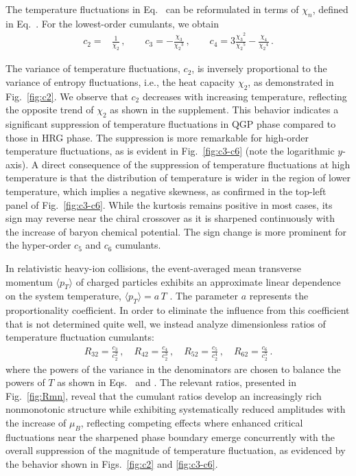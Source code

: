 \documentclass[aps,twocolumn,prd,superscriptaddress,nofootinbib,floatfix]{revtex4-2}
\begin{document}
The temperature fluctuations in Eq.~ can be reformulated in terms of $\chi_n$, defined in Eq.~. For the lowest-order cumulants, we obtain
\begin{align}
    c_2=&\frac{1}{\chi_2}\,, \qquad c_3=-\frac{\chi_3}{{\chi_2}^3}\,, \qquad c_4=3\frac{{\chi_3}^2}{{\chi_2}^5}-\frac{\chi_4}{{\chi_2}^4}\,. \label{}
\end{align}

The variance of temperature fluctuations, $c_2$, is inversely proportional to the variance of entropy fluctuations, i.e., the heat capacity $\chi_2$, as demonstrated in Fig.~\ref{fig:c2}. We observe that $c_2$ decreases with increasing temperature, reflecting the opposite trend of $\chi_2$ as shown in the supplement. This behavior indicates a significant suppression of temperature fluctuations in QGP phase compared to those in HRG phase. The suppression is more remarkable for high-order temperature fluctuations, as is evident in Fig.~\ref{fig:c3-c6} 
(note the logarithmic $y$-axis). A direct consequence of the suppression of temperature fluctuations at high temperature is that the distribution of temperature is wider in the region of lower temperature, which implies a negative skewness, as confirmed in the top-left panel of Fig.~\ref{fig:c3-c6}. While the kurtosis remains positive in most cases, its sign may reverse near the chiral crossover as it is sharpened continuously with the increase of baryon chemical potential. The sign change is more prominent for the hyper-order $c_5$ and $c_6$ cumulants.

In relativistic heavy-ion collisions, the event-averaged mean transverse momentum $\langle p_{T} \rangle$ of charged particles exhibits an approximate linear dependence on the system temperature, $\langle p_{T} \rangle = a\,T$ \cite{Gardim:2019xjs, Gardim:2019brr, Giacalone:2020lbm, Gardim:2024zvi}. The parameter $a$ represents the proportionality coefficient. In order to eliminate the influence from this coefficient that is not determined quite well, we instead analyze dimensionless ratios of temperature fluctuation cumulants: 
\begin{align}
    R_{32}=\frac{c_3}{c_2^2}\,, \quad R_{42}=\frac{c_4}{c_2^3}\,,\quad R_{52}=\frac{c_5}{c_2^4}\,,\quad R_{62}=\frac{c_6}{c_2^5}\,.\label{eq:R32R42}
\end{align}
where the powers of the variance in the denominators are chosen to balance the powers of $T$ as shown in Eqs.~ and . The relevant ratios, presented in Fig.~\ref{fig:Rmn}, reveal that the cumulant ratios develop an increasingly rich nonmonotonic structure while exhibiting systematically reduced amplitudes with the increase of $\mu_B$, reflecting competing effects where enhanced critical fluctuations near the sharpened phase boundary emerge concurrently with the overall suppression of the magnitude of temperature fluctuation, as evidenced by the behavior shown in Figs.~\ref{fig:c2} and \ref{fig:c3-c6}. 
\end{document}

